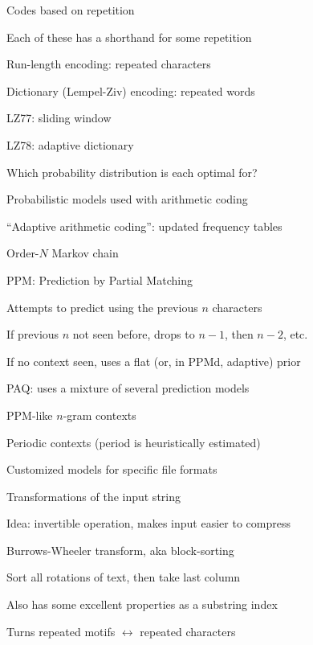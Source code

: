\documentclass{beamer}
\begin{document}
\begin{frame}{Codes based on repetition}

\itemb
\item Each of these has a shorthand for some repetition
\itemb
\item \alert{Run-length encoding}: repeated characters
\item Dictionary (\alert{Lempel-Ziv}) encoding: repeated words
 \itemb
  \item LZ77: sliding window
  \item LZ78: adaptive dictionary
 \iteme
\iteme
\item \alert{Which probability distribution is each optimal for?}
\iteme


\end{frame}

\begin{frame}{Probabilistic models used with arithmetic coding}

\itemb
\item ``Adaptive arithmetic coding'': updated frequency tables
\item Order-$N$ Markov chain
\item \alert{PPM}: Prediction by Partial Matching
\itemb
\item Attempts to predict using the previous $n$ characters
\item If previous $n$ not seen before, drops to $n-1$, then $n-2$, etc.
\item If no context seen, uses a flat (or, in PPMd, adaptive) prior
\iteme
\item \alert{PAQ}: uses a mixture of several prediction models
\itemb
\item PPM-like $n$-gram contexts
\item Periodic contexts (period is heuristically estimated)
\item Customized models for specific file formats
\iteme
\iteme

\end{frame}

\begin{frame}{Transformations of the input string}

\itemb
\item Idea: invertible operation, makes input easier to compress
\item \alert{Burrows-Wheeler transform}, aka block-sorting
\itemb
 \item Sort all rotations of text, then take last column
 \item Also has some excellent properties as a \alert{substring index}
\iteme
\item Turns repeated motifs $\leftrightarrow$ repeated characters
\iteme


\end{frame}
\end{document}
